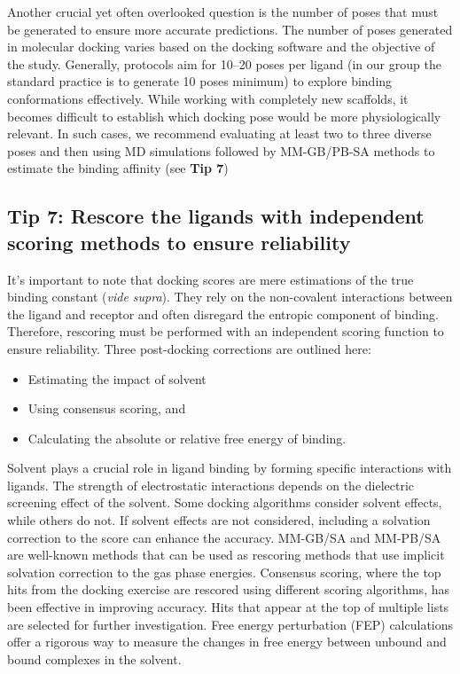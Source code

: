 \documentclass[10pt,letterpaper]{article}
\begin{document}
{{Another crucial yet often overlooked question is the number of poses that must be generated to ensure more accurate predictions.  The number of poses generated in molecular docking varies based on the docking software and the objective of the study. Generally, protocols aim for 10–20 poses per ligand (in our group the standard practice is to generate 10 poses minimum)\cite{bib10} to explore binding conformations effectively. While working with completely new scaffolds, it becomes difficult to establish which docking pose would be more physiologically relevant. In such cases, we recommend evaluating at least two to three diverse poses and then using MD simulations followed by MM-GB/PB-SA methods to estimate the binding affinity (see \textbf{Tip 7})

\subsection*{Tip 7: Rescore the ligands with independent scoring methods to ensure reliability}
It's important to note that docking scores are mere estimations of the true binding constant (\textit{vide supra}). They rely on the non-covalent interactions between the ligand and receptor and often disregard the entropic component of binding. Therefore, rescoring must be performed with an independent scoring function to ensure reliability.
    Three post-docking corrections are outlined here:
    \begin{itemize}
        \item Estimating the impact of solvent
        \item Using consensus scoring, and 
        \item Calculating the absolute or relative free energy of binding.
    \end{itemize}
Solvent plays a crucial role in ligand binding by forming specific interactions with ligands. The strength of electrostatic interactions depends on the dielectric screening effect of the solvent. Some docking algorithms consider solvent effects, while others do not. If solvent effects are not considered, including a solvation correction to the score can enhance the accuracy. MM-GB/SA and MM-PB/SA are well-known methods that can be used as rescoring methods that use implicit solvation correction to the gas phase energies\cite{bib13}. Consensus scoring, where the top hits from the docking exercise are rescored using different scoring algorithms, has been effective in improving accuracy. Hits that appear at the top of multiple lists are selected for further investigation. Free energy perturbation (FEP) calculations offer a rigorous way to measure the changes in free energy between unbound and bound complexes in the solvent.

}}
\end{document}
